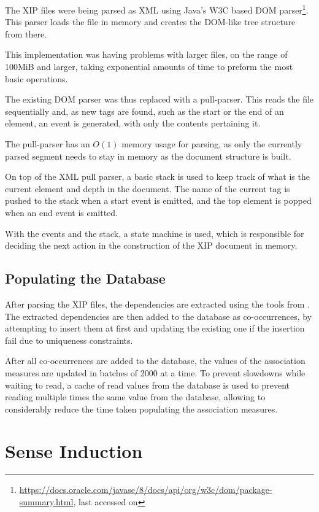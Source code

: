 The \ac{XIP} files were being parsed as XML using Java's W3C based \ac{DOM}
parser\footnote{\url{https://docs.oracle.com/javase/8/docs/api/org/w3c/dom/package-summary.html},
last accessed on }. This parser loads the file in memory and
creates the \ac{DOM}-like tree structure from there.

This implementation was having problems with larger files, on the range of
100MiB and larger, taking exponential amounts of time to preform the most basic
operations.

The existing \ac{DOM} parser was thus replaced with a pull-parser. This reads
the file sequentially and, as new tags are found, such as the start or the
end of an element, an event is generated, with only the contents pertaining it.

The pull-parser has an $O(1)$ memory usage for parsing, as only the currently
parsed segment needs to stay in memory as the document structure is built.

On top of the XML pull parser, a basic stack is used to keep track of what is
the current element and depth in the document. The name of the current tag
is pushed to the stack when a start event is emitted, and the top element is
popped when an end event is emitted.

With the events and the stack, a state machine is used, which is responsible for
deciding the next action in the construction of the XIP document in memory.

\subsection{Populating the Database}

After parsing the \ac{XIP} files, the dependencies are extracted using the
tools from \cite{correia2015syntax}. The extracted dependencies are then added
to the database as co-occurrences, by attempting to insert them at first and
updating the existing one if the insertion fail due to uniqueness constraints.

After all co-occurrences are added to the database, the values of the
association measures are updated in batches of 2000 at a time. To prevent
slowdowns while waiting to read, a cache of read values from the database is
used to prevent reading multiple times the same value from the database,
allowing to considerably reduce the time taken populating the association
measures.

\section{Sense Induction}

